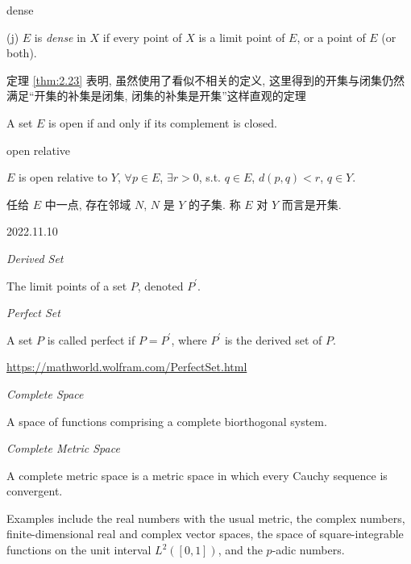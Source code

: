 \begin{mydef} dense

    (j) $E$ is \emph{dense} in $X$ if every point of $X$ is a limit point of $E$, or a point of $E$ (or both).
\end{mydef}

定理 \ref{thm:2.23} 表明, 虽然使用了看似不相关的定义, 这里得到的开集与闭集仍然满足``开集的补集是闭集, 闭集的补集是开集''这样直观的定理
\begin{mynewthm}
    A set $E$ is open if and only if its complement is closed.
\end{mynewthm}

\begin{mydef} open relative

    $E$ is open relative to $Y$, $\forall p \in E$, $\exists r>0$, s.t. $q \in E$, $d(p, q)<r$, $q \in Y$.
\end{mydef}
任给 $E$ 中一点, 存在邻域 $N$, $N$ 是 $Y$ 的子集. 称 $E$ 对 $Y$ 而言是开集.


2022.11.10

\begin{mydef}
    \emph{Derived Set}

    The limit points of a set ${P}$, denoted $P^{'}$. 
\end{mydef}

\begin{mydef}
    \emph{Perfect Set}

    A set $P$ is called perfect if $P=P^{'}$, where $P^{'}$ is the derived set of $P$.
\end{mydef}
\url{https://mathworld.wolfram.com/PerfectSet.html}

\begin{mydef}
    \emph{Complete Space}

    A space of functions comprising a complete biorthogonal system.
\end{mydef}

\begin{mydef}
    \emph{Complete Metric Space}

    A complete metric space is a metric space in which every Cauchy sequence is convergent.

    Examples include the real numbers with the usual metric, the complex numbers, finite-dimensional real and complex vector spaces, the space of square-integrable functions on the unit interval $L^2([0,1])$, and the $p$-adic numbers.
\end{mydef}